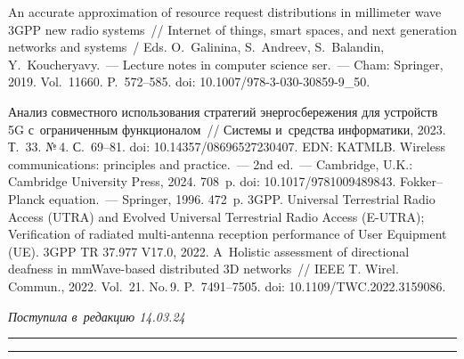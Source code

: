 \begin{multicols}{2}
{{\begin{thebibliography}{99}
 An accurate approximation 
of resource request distributions in millimeter wave 3GPP new radio systems~// Internet of 
things, smart spaces, and next generation networks and systems~/ Eds. O.~Galinina, S.~Andreev, 
S.~Balandin, Y.~Koucheryavy.~--- Lecture notes in computer science ser.~--- Cham: Springer, 
2019. Vol.~11660. P.~572--585. doi: 10.1007/978-3-030-30859-9\_50.

 Анализ \mbox{совместного} использования стратегий энергосбережения для 
устройств 5G с~ограниченным функционалом~// Сис\-те\-мы и~средства информатики, 2023. 
Т.~33. №\,4. С.~69--81. doi: 10.14357/08696527230407.  EDN: KATMLB.
 Wireless communications: principles and practice.~--- 2nd ed.~--- Cambridge, U.K.: 
Cambridge University Press, 2024. 708~p. doi: 10.1017/9781009489843.
 Fokker--Planck equation.~--- Springer, 1996. 472~p.
3GPP. Universal Terrestrial Radio Access (UTRA) and Evolved Universal Terrestrial Radio 
Access (E-UTRA); Verification of radiated multi-antenna reception performance of User 
Equipment (UE). 3GPP TR 37.977 V17.0, 2022.
 A~Holistic assessment of directional deafness in mmWave-based distributed 3D 
networks~// IEEE T. Wirel. Commun., 2022. Vol.~21. No.\,9. P.~7491--7505. 
doi: 10.1109/TWC.2022.3159086.

\end{thebibliography}

 }
 }

\end{multicols}

\vspace*{-6pt}

\hfill{\small\textit{Поступила в~редакцию 14.03.24}}

\vspace*{10pt}




\hrule

\vspace*{2pt}

\hrule




